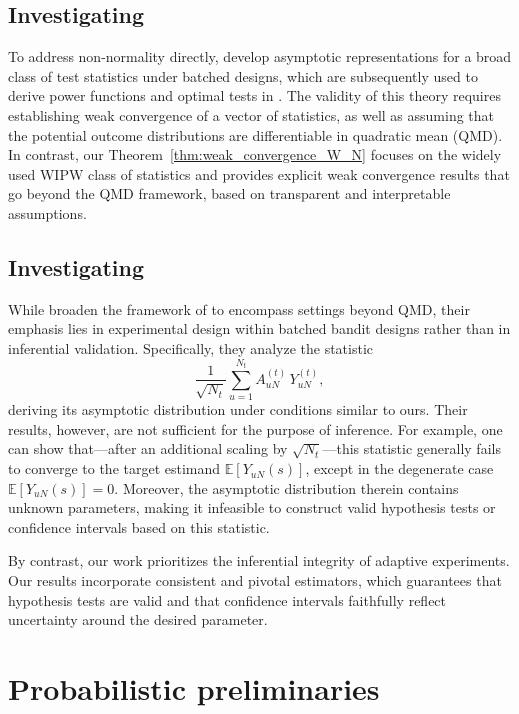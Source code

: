 \documentclass[12pt]{article}
\newcommand{\E}{\mathbb E}								%
\begin{document}
\subsection{Investigating \citet{Hirano2023,adusumilli2023optimal}}

To address non-normality directly, \citet{Hirano2023} develop asymptotic representations for a broad class of test statistics under batched designs, which are subsequently used to derive power functions and optimal tests in \citet{adusumilli2023optimal}. The validity of this theory requires establishing weak convergence of a vector of statistics, as well as assuming that the potential outcome distributions are differentiable in quadratic mean (QMD). In contrast, our Theorem~\ref{thm:weak_convergence_W_N} focuses on the widely used WIPW class of statistics and provides explicit weak convergence results that go beyond the QMD framework, based on transparent and interpretable assumptions. 

\subsection{Investigating \citet{che2023adaptive}}\label{sec:inspection_Che}

While \citet{che2023adaptive} broaden the framework of \citet{Hirano2023} to encompass settings beyond QMD, 
their emphasis lies in experimental design within batched bandit designs rather than in inferential validation. Specifically, they analyze the statistic  
\[
\frac{1}{\sqrt{N_t}}\sum_{u=1}^{N_t}A_{uN}^{(t)}\,Y_{uN}^{(t)},
\]  
deriving its asymptotic distribution under conditions similar to ours. Their results, 
however, are not sufficient for the purpose of inference.
For example, one can show that—after an additional scaling by $\sqrt{N_t}$—this statistic generally fails to converge to the target estimand $\E[Y_{uN}(s)]$, except in the degenerate case $\E[Y_{uN}(s)]=0$.
Moreover, the asymptotic distribution therein contains unknown parameters, 
making it infeasible to construct valid hypothesis tests or confidence intervals based on this statistic.

By contrast, our work prioritizes the inferential integrity of adaptive experiments. Our results incorporate consistent and pivotal estimators, which
guarantees that hypothesis tests are valid and that confidence intervals faithfully reflect uncertainty around the desired parameter.



\section{Probabilistic preliminaries}\label{sec:auxiliary_Notation}
\end{document}
